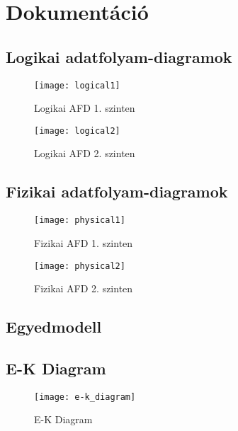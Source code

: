\section{Dokumentáció}\label{sec:dokumentacio}

\subsection{Logikai adatfolyam-diagramok}

\begin{figure}[!htb]

    \centering
    \texttt{[image: logical1]}
    \caption{\label{fig:logical1}Logikai AFD 1. szinten}

\end{figure}

\begin{figure}[!htb]

    \centering
    \texttt{[image: logical2]}
    \caption{\label{fig:logical2}Logikai AFD 2. szinten}

\end{figure}
\pagebreak

\subsection{Fizikai adatfolyam-diagramok}

\begin{figure}[!htb]

    \centering
    \texttt{[image: physical1]}
    \caption{\label{fig:physical1}Fizikai AFD 1. szinten}

\end{figure}

\begin{figure}[!htb]

    \centering
    \texttt{[image: physical2]}
    \caption{\label{fig:physical2}Fizikai AFD 2. szinten}

\end{figure}
\pagebreak
\subsection{Egyedmodell}
\pagebreak
\subsection{E-K Diagram}

\begin{figure}[!htb]

    \centering
    \texttt{[image: e-k\_diagram]}
    \caption{\label{fig:e-k_diagram}E-K Diagram}

\end{figure}
\pagebreak
